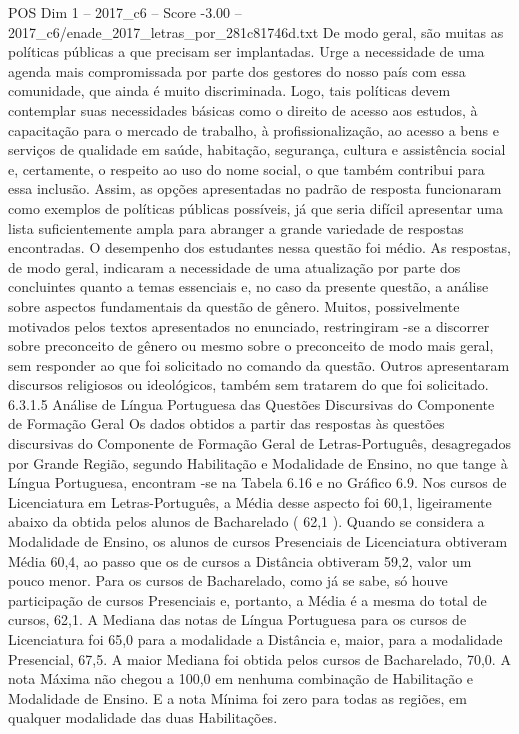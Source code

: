 \begin{textsample}{POS Dim 1 – 2017\_c6 – Score -3.00 – 2017\_c6/enade\_2017\_letras\_por\_281c81746d.txt}
De modo geral, são muitas as políticas públicas a que precisam ser implantadas.
Urge a necessidade de uma agenda mais compromissada por parte dos gestores do nosso país com essa comunidade, que ainda é muito discriminada.
Logo, tais políticas devem contemplar suas necessidades básicas como o direito de acesso aos estudos, à capacitação para o mercado de trabalho, à profissionalização, ao acesso a bens e serviços de qualidade em saúde, habitação, segurança, cultura e assistência social e, certamente, o respeito ao uso do nome social, o que também contribui para essa inclusão.
Assim, as opções apresentadas no padrão de resposta funcionaram como exemplos de políticas públicas possíveis, já que seria difícil apresentar uma lista suficientemente ampla para abranger a grande variedade de respostas encontradas.
O desempenho dos estudantes nessa questão foi médio.
As respostas, de modo geral, indicaram a necessidade de uma atualização por parte dos concluintes quanto a temas essenciais e, no caso da presente questão, a análise sobre aspectos fundamentais da questão de gênero.
Muitos, possivelmente motivados pelos textos apresentados no enunciado, restringiram -se a discorrer sobre preconceito de gênero ou mesmo sobre o preconceito de modo mais geral, sem responder ao que foi solicitado no comando da questão.
Outros apresentaram discursos religiosos ou ideológicos, também sem tratarem do que foi solicitado. 6.3.1.5 Análise de Língua Portuguesa das Questões Discursivas do Componente de Formação Geral Os dados obtidos a partir das respostas às questões discursivas do Componente de Formação Geral de Letras-Português, desagregados por Grande Região, segundo Habilitação e Modalidade de Ensino, no que tange à Língua Portuguesa, encontram -se na Tabela 6.16 e no Gráfico 6.9.
Nos cursos de Licenciatura em Letras-Português, a Média desse aspecto foi 60,1, ligeiramente abaixo da obtida pelos alunos de Bacharelado ( 62,1 ).
Quando se considera a Modalidade de Ensino, os alunos de cursos Presenciais de Licenciatura obtiveram Média 60,4, ao passo que os de cursos a Distância obtiveram 59,2, valor um pouco menor.
Para os cursos de Bacharelado, como já se sabe, só houve participação de cursos Presenciais e, portanto, a Média é a mesma do total de cursos, 62,1.
A Mediana das notas de Língua Portuguesa para os cursos de Licenciatura foi 65,0 para a modalidade a Distância e, maior, para a modalidade Presencial, 67,5.
A maior Mediana foi obtida pelos cursos de Bacharelado, 70,0.
A nota Máxima não chegou a 100,0 em nenhuma combinação de Habilitação e Modalidade de Ensino.
E a nota Mínima foi zero para todas as regiões, em qualquer modalidade das duas Habilitações.

\end{textsample}
